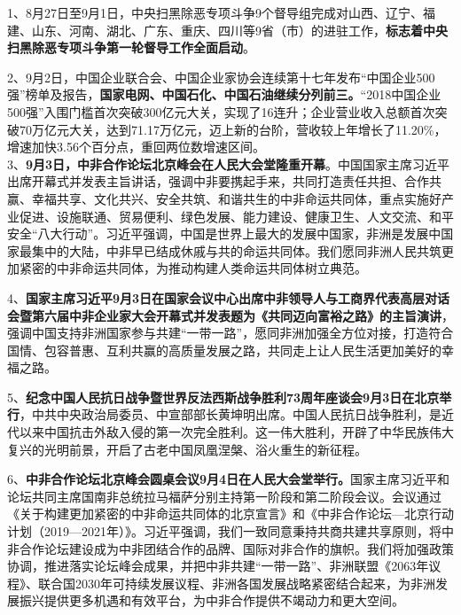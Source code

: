 1、8月27日至9月1日，中央扫黑除恶专项斗争9个督导组完成对山西、辽宁、福建、山东、河南、湖北、广东、重庆、四川等9省（市）的进驻工作，{\textbf{标志着中央扫黑除恶专项斗争第一轮督导工作全面启动}}。

2、9月2日，中国企业联合会、中国企业家协会连续第十七年发布``中国企业500强''榜单及报告，{\textbf{国家电网、中国石化、中国石油继续分列前三。}}``2018中国企业500强''入围门槛首次突破300亿元大关，实现了16连升；企业营业收入总额首次突破70万亿元大关，达到71.17万亿元，迈上新的台阶，营收较上年增长了11.20\%，增速加快3.56个百分点，重回两位数增速区间。\\

3、{\textbf{9月3日，中非合作论坛北京峰会在人民大会堂隆重开幕}}。中国国家主席习近平出席开幕式并发表主旨讲话，强调中非要携起手来，共同打造责任共担、合作共赢、幸福共享、文化共兴、安全共筑、和谐共生的中非命运共同体，重点实施好产业促进、设施联通、贸易便利、绿色发展、能力建设、健康卫生、人文交流、和平安全``八大行动''。习近平强调，中国是世界上最大的发展中国家，非洲是发展中国家最集中的大陆，中非早已结成休戚与共的命运共同体。我们愿同非洲人民共筑更加紧密的中非命运共同体，为推动构建人类命运共同体树立典范。

4、{\textbf{国家主席习近平9月3日在国家会议中心出席中非领导人与工商界代表高层对话会暨第六届中非企业家大会开幕式并发表题为《共同迈向富裕之路》的主旨演讲}}，强调中国支持非洲国家参与共建``一带一路''，愿同非洲加强全方位对接，打造符合国情、包容普惠、互利共赢的高质量发展之路，共同走上让人民生活更加美好的幸福之路。

5、{\textbf{纪念中国人民抗日战争暨世界反法西斯战争胜利73周年座谈会9月3日在北京举行}}，中共中央政治局委员、中宣部部长黄坤明出席。中国人民抗日战争胜利，是近代以来中国抗击外敌入侵的第一次完全胜利。这一伟大胜利，开辟了中华民族伟大复兴的光明前景，开启了古老中国凤凰涅槃、浴火重生的新征程。

6、{\textbf{中非合作论坛北京峰会圆桌会议9月4日在人民大会堂举行。}}国家主席习近平和论坛共同主席国南非总统拉马福萨分别主持第一阶段和第二阶段会议。会议通过《关于构建更加紧密的中非命运共同体的北京宣言》和《中非合作论坛---北京行动计划（2019---2021年）》。习近平强调，我们一致同意秉持共商共建共享原则，将中非合作论坛建设成为中非团结合作的品牌、国际对非合作的旗帜。我们将加强政策协调，推进落实论坛峰会成果，并把中非共建``一带一路''、非洲联盟《2063年议程》、联合国2030年可持续发展议程、非洲各国发展战略紧密结合起来，为非洲发展振兴提供更多机遇和有效平台，为中非合作提供不竭动力和更大空间。\\

